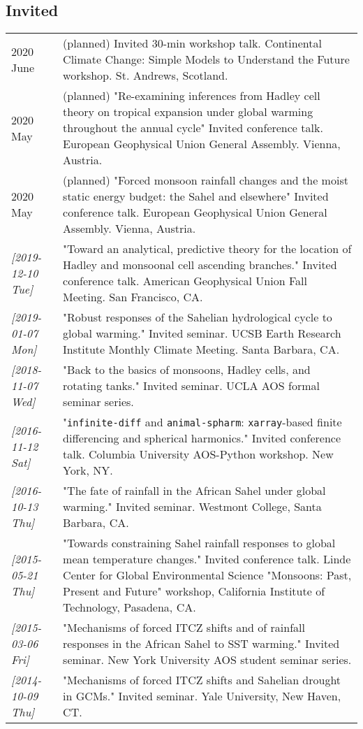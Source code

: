 \documentclass[12pt,letterpaper]{shillcv}
\begin{document}
\subsection*{Invited}
\label{sec:org3a38a37}
\begin{center}
\begin{tabularx}{\textwidth}{lX}
2020 June & (planned) Invited 30-min workshop talk.  Continental Climate Change: Simple Models to Understand the Future workshop.  St. Andrews, Scotland.\\
2020 May & (planned) "Re-examining inferences from Hadley cell theory on tropical expansion under global warming throughout the annual cycle" Invited conference talk.  European Geophysical Union General Assembly.  Vienna, Austria.\\
2020 May & (planned) "Forced monsoon rainfall changes and the moist static energy budget: the Sahel and elsewhere" Invited conference talk.  European Geophysical Union General Assembly.  Vienna, Austria.\\
\textit{[2019-12-10 Tue]} & "Toward an analytical, predictive theory for the location of Hadley and monsoonal cell ascending branches."  Invited conference talk.  American Geophysical Union Fall Meeting.  San Francisco, CA.\\
\textit{[2019-01-07 Mon]} & "Robust responses of the Sahelian hydrological cycle to global warming."  Invited seminar.  UCSB Earth Research Institute Monthly Climate Meeting.  Santa Barbara, CA.\\
\textit{[2018-11-07 Wed]} & "Back to the basics of monsoons, Hadley cells, and rotating tanks."  Invited seminar.  UCLA AOS formal seminar series.\\
\textit{[2016-11-12 Sat]} & "\texttt{infinite-diff} and \texttt{animal-spharm}: \texttt{xarray}-based finite differencing and spherical harmonics."  Invited conference talk.  Columbia University AOS-Python workshop.  New York, NY.\\
\textit{[2016-10-13 Thu]} & "The fate of rainfall in the African Sahel under global warming."  Invited seminar.  Westmont College, Santa Barbara, CA.\\
\textit{[2015-05-21 Thu]} & "Towards constraining Sahel rainfall responses to global mean temperature changes."  Invited conference talk.  Linde Center for Global Environmental Science "Monsoons: Past, Present and Future" workshop, California Institute of Technology, Pasadena, CA.\\
\textit{[2015-03-06 Fri]} & "Mechanisms of forced ITCZ shifts and of rainfall responses in the African Sahel to SST warming."  Invited seminar.  New York University AOS student seminar series.\\
\textit{[2014-10-09 Thu]} & "Mechanisms of forced ITCZ shifts and Sahelian drought in GCMs."  Invited seminar.  Yale University, New Haven, CT.\\
\end{tabularx}
\end{center}
\end{document}
